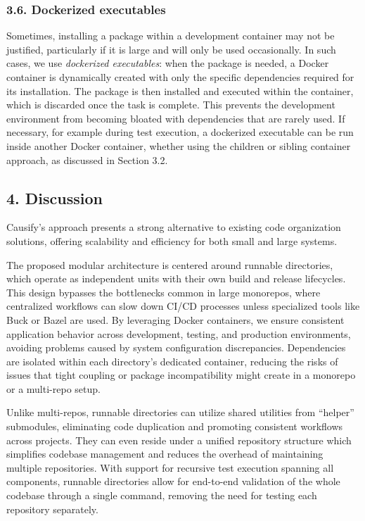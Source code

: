 \documentclass{article}
\begin{document}
\subsubsection{3.6. Dockerized executables}
\label{dockerized-executables}

Sometimes, installing a package within a development container may not be
justified, particularly if it is large and will only be used occasionally. In
such cases, we use \emph{dockerized executables}: when the package is needed, a
Docker container is dynamically created with only the specific dependencies
required for its installation. The package is then installed and executed within
the container, which is discarded once the task is complete. This prevents the development
environment from becoming bloated with dependencies that are rarely used. If
necessary, for example during test execution, a dockerized executable can be run
inside another Docker container, whether using the children or sibling container
approach, as discussed in Section 3.2.

\subsection{4. Discussion}
\label{discussion}

Causify's approach presents a strong alternative to existing code organization solutions,
offering scalability and efficiency for both small and large systems.

The proposed modular architecture is centered around runnable directories, which
operate as independent units with their own build and release lifecycles. This
design bypasses the bottlenecks common in large monorepos, where centralized workflows
can slow down CI/CD processes unless specialized tools like Buck or Bazel are used.
By leveraging Docker containers, we ensure consistent application behavior across
development, testing, and production environments, avoiding problems caused by
system configuration discrepancies. Dependencies are isolated within each directory's
dedicated container, reducing the risks of issues that tight coupling or package
incompatibility might create in a monorepo or a multi-repo setup.

Unlike multi-repos, runnable directories can utilize shared utilities from ``helper''
submodules, eliminating code duplication and promoting consistent workflows
across projects. They can even reside under a unified repository structure which
simplifies codebase management and reduces the overhead of maintaining multiple repositories.
With support for recursive test execution spanning all components, runnable directories
allow for end-to-end validation of the whole codebase through a single command,
removing the need for testing each repository separately.
\end{document}
